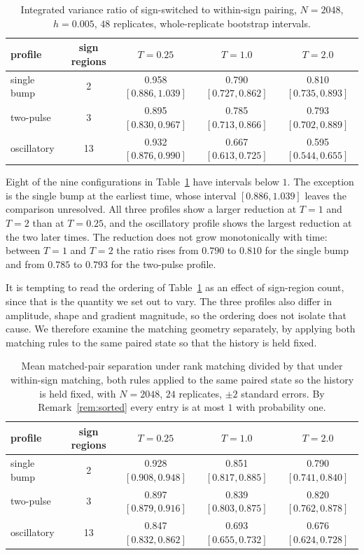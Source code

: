 \documentclass[smallextended,nospthms]{svjour3}
\theoremstyle{plain}
\theoremstyle{definition}
\theoremstyle{remark}
\numberwithin{equation}{section}
\begin{document}
\begin{table}[htbp]
\centering
\caption{Integrated variance ratio of sign-switched to within-sign pairing,
$N=2048$, $h=0.005$, $48$ replicates, whole-replicate bootstrap intervals.}
\label{tab:ladder}
\small
\setlength{\tabcolsep}{3pt}
\begin{tabular}{lcccc}
\toprule
profile & sign regions & $T=0.25$ & $T=1.0$ & $T=2.0$\\
\midrule
single bump  & 2  & 0.958 $[0.886,1.039]$ & 0.790 $[0.727,0.862]$ & 0.810 $[0.735,0.893]$\\
two-pulse    & 3  & 0.895 $[0.830,0.967]$ & 0.785 $[0.713,0.866]$ & 0.793 $[0.702,0.889]$\\
oscillatory  & 13 & 0.932 $[0.876,0.990]$ & 0.667 $[0.613,0.725]$ & 0.595 $[0.544,0.655]$\\
\bottomrule
\end{tabular}
\end{table}

Eight of the nine configurations in Table~\ref{tab:ladder} have intervals below
$1$. The exception is the single bump at the earliest time, whose interval
$[0.886,1.039]$ leaves the comparison unresolved. All three profiles show a
larger reduction at $T=1$ and $T=2$ than at $T=0.25$, and the oscillatory
profile shows the largest reduction at the two later times. The reduction does
not grow monotonically with time: between $T=1$ and $T=2$ the ratio rises from
$0.790$ to $0.810$ for the single bump and from $0.785$ to $0.793$ for the
two-pulse profile.

It is tempting to read the ordering of Table~\ref{tab:ladder} as an effect of
sign-region count, since that is the quantity we set out to vary. The three
profiles also differ in amplitude, shape and gradient magnitude, so the
ordering does not isolate that cause. We therefore examine the matching
geometry separately, by applying both matching rules to the same paired state
so that the history is held fixed.

\begin{table}[htbp]
\centering
\caption{Mean matched-pair separation under rank matching divided by that under
within-sign matching, both rules applied to the same paired state so the
history is held fixed, with $N=2048$, $24$ replicates, $\pm2$ standard errors. By
Remark~\ref{rem:sorted} every entry is at most $1$ with probability one.}
\label{tab:separation}
\small
\setlength{\tabcolsep}{3pt}
\begin{tabular}{lcccc}
\toprule
profile & sign regions & $T=0.25$ & $T=1.0$ & $T=2.0$\\
\midrule
single bump  & 2  & 0.928 $[0.908,0.948]$ & 0.851 $[0.817,0.885]$ & 0.790 $[0.741,0.840]$\\
two-pulse    & 3  & 0.897 $[0.879,0.916]$ & 0.839 $[0.803,0.875]$ & 0.820 $[0.762,0.878]$\\
oscillatory  & 13 & 0.847 $[0.832,0.862]$ & 0.693 $[0.655,0.732]$ & 0.676 $[0.624,0.728]$\\
\bottomrule
\end{tabular}
\end{table}
\end{document}
